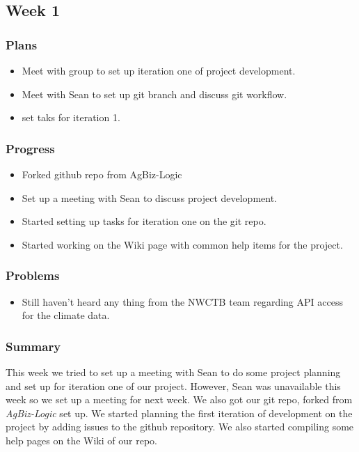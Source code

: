 \documentclass[onecolumn, draftclsnofoot,10pt, compsoc]{article}
\begin{document}
		\subsection{Week 1}
			\subsubsection{Plans}
				\begin{itemize}
					\item Meet with group to set up iteration one of project development.
					\item Meet with Sean to set up git branch and discuss git workflow.
					\item set taks for iteration 1.
				\end{itemize}

			\subsubsection{Progress}
				\begin{itemize}
					\item Forked github repo from AgBiz-Logic
					\item Set up a meeting with Sean to discuss project development.
					\item Started setting up tasks for iteration one on the git repo.
					\item Started working on the Wiki page with common help items for the project.
				\end{itemize}
			\subsubsection{Problems}
				\begin{itemize}
					\item Still haven't heard any thing from the NWCTB team regarding API access for the climate data.
				\end{itemize}

			\subsubsection{Summary}
			This week we tried to set up a meeting with Sean to do some project planning and set up for iteration one of our project. However, Sean was unavailable this week so we set up a meeting for next week. We also got our git repo, forked from \textit{AgBiz-Logic} set up. We started planning the first iteration of development on the project by adding issues to the github repository. We also started compiling some help pages on the Wiki of our repo.\\
\end{document}

